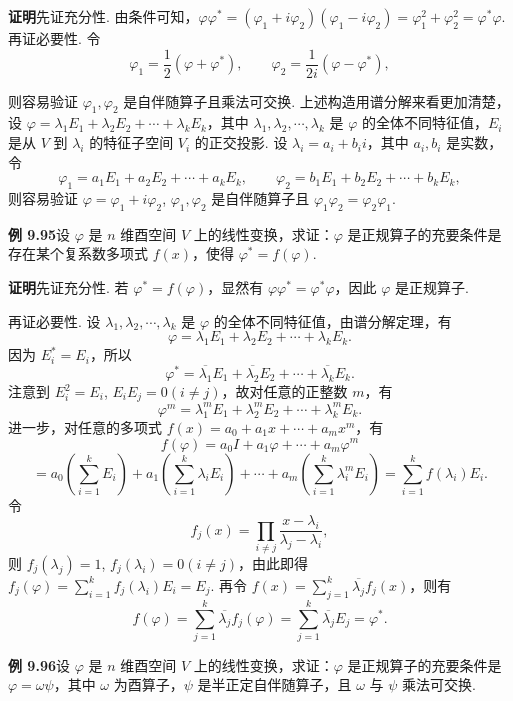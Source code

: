 \documentclass[UTF8,12pt,a4paper,fontset=fandol]{ctexart}
\begin{document}
\noindent\textbf{证明}\quad 先证充分性. 由条件可知，$\varphi\varphi^*=(\varphi_1+i\varphi_2)(\varphi_1-i\varphi_2)=\varphi_1^2+\varphi_2^2=\varphi^*\varphi$.
再证必要性. 令
\[
\varphi_1=\frac12(\varphi+\varphi^*),\qquad
\varphi_2=\frac1{2i}(\varphi-\varphi^*),
\]

则容易验证 $\varphi_1,\varphi_2$ 是自伴随算子且乘法可交换. 上述构造用谱分解来看更加清楚，设 $\varphi=\lambda_1E_1+\lambda_2E_2+\cdots+\lambda_kE_k$，其中 $\lambda_1,\lambda_2,\cdots,\lambda_k$ 是 $\varphi$ 的全体不同特征值，$E_i$ 是从 $V$ 到 $\lambda_i$ 的特征子空间 $V_i$ 的正交投影. 设 $\lambda_i=a_i+b_ii$，其中 $a_i,b_i$ 是实数，令
\[
\varphi_1=a_1E_1+a_2E_2+\cdots+a_kE_k,\qquad
\varphi_2=b_1E_1+b_2E_2+\cdots+b_kE_k,
\]
则容易验证 $\varphi=\varphi_1+i\varphi_2$, $\varphi_1,\varphi_2$ 是自伴随算子且 $\varphi_1\varphi_2=\varphi_2\varphi_1$.

\noindent\textbf{例 9.95}\quad 设 $\varphi$ 是 $n$ 维酉空间 $V$ 上的线性变换，求证：$\varphi$ 是正规算子的充要条件是存在某个复系数多项式 $f(x)$，使得 $\varphi^*=f(\varphi)$.

\noindent\textbf{证明}\quad 先证充分性. 若 $\varphi^*=f(\varphi)$，显然有 $\varphi\varphi^*=\varphi^*\varphi$，因此 $\varphi$ 是正规算子.

再证必要性. 设 $\lambda_1,\lambda_2,\cdots,\lambda_k$ 是 $\varphi$ 的全体不同特征值，由谱分解定理，有
\[
\varphi=\lambda_1E_1+\lambda_2E_2+\cdots+\lambda_kE_k.
\]
因为 $E_i^*=E_i$，所以
\[
\varphi^*=\overline{\lambda_1}E_1+\overline{\lambda_2}E_2+\cdots+\overline{\lambda_k}E_k.
\]
注意到 $E_i^2=E_i$, $E_iE_j=0(i\ne j)$，故对任意的正整数 $m$，有
\[
\varphi^m=\lambda_1^mE_1+\lambda_2^mE_2+\cdots+\lambda_k^mE_k.
\]
进一步，对任意的多项式 $f(x)=a_0+a_1x+\cdots+a_mx^m$，有
\[
f(\varphi)=a_0I+a_1\varphi+\cdots+a_m\varphi^m
\]
\[
=a_0\left(\sum_{i=1}^kE_i\right)+a_1\left(\sum_{i=1}^k\lambda_iE_i\right)+\cdots+a_m\left(\sum_{i=1}^k\lambda_i^mE_i\right)
=\sum_{i=1}^kf(\lambda_i)E_i.
\]
令
\[
f_j(x)=\prod_{i\ne j}\frac{x-\lambda_i}{\lambda_j-\lambda_i},
\]
则 $f_j(\lambda_j)=1$, $f_j(\lambda_i)=0(i\ne j)$，由此即得 $f_j(\varphi)=\sum_{i=1}^kf_j(\lambda_i)E_i=E_j$. 再令 $f(x)=\sum_{j=1}^k\overline{\lambda_j}f_j(x)$，则有
\[
f(\varphi)=\sum_{j=1}^k\overline{\lambda_j}f_j(\varphi)=\sum_{j=1}^k\overline{\lambda_j}E_j=\varphi^*.
\]

\noindent\textbf{例 9.96}\quad 设 $\varphi$ 是 $n$ 维酉空间 $V$ 上的线性变换，求证：$\varphi$ 是正规算子的充要条件是 $\varphi=\omega\psi$，其中 $\omega$ 为酉算子，$\psi$ 是半正定自伴随算子，且 $\omega$ 与 $\psi$ 乘法可交换.
\end{document}
